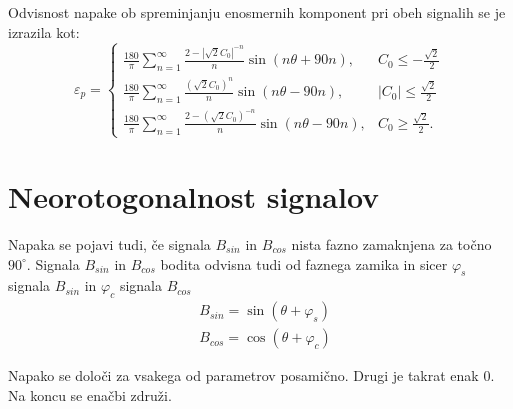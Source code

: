 Odvisnost napake ob spreminjanju enosmernih komponent pri obeh signalih se je izrazila kot:
\begin{equation}
\label{vrsta_sincosoff}
\varepsilon_p=
\begin{cases}
\frac{180}{\pi}\sum_{n=1}^{\infty}\frac{2-|\sqrt{2}C_0|^{-n}}{n} \sin (n \theta + 90 n), & C_0\leq -\frac{\sqrt{2}}{2} \\
\frac{180}{\pi}\sum_{n=1}^{\infty}\frac{(\sqrt{2}C_0)^n}{n} \sin (n \theta - 90 n), & |C_0|\leq \frac{\sqrt{2}}{2} \\
\frac{180}{\pi}\sum_{n=1}^{\infty}\frac{2-(\sqrt{2}C_0)^{-n}}{n} \sin (n \theta - 90 n), & C_0\geq \frac{\sqrt{2}}{2}.
\end{cases}
\end{equation}

\section{Neorotogonalnost signalov}
Napaka se pojavi tudi, če signala $B_{sin}$ in $B_{cos}$ nista fazno zamaknjena za točno $90^\circ$. Signala $B_{sin}$ in $B_{cos}$ bodita odvisna tudi od faznega zamika in sicer
$\varphi_{s}$ signala $B_{sin}$ in $\varphi_{c}$ signala $B_{cos}$
\begin{eqnarray}
\label{equ:def_sin_fis}
&B_{sin} = \sin(\theta + \varphi_{s})\\
\label{equ:def_cos_fis}
&B_{cos} =\cos(\theta+\varphi_{c})
\end{eqnarray}

Napako se določi za vsakega od parametrov posamično. Drugi je takrat enak 0. Na koncu se enačbi združi.

